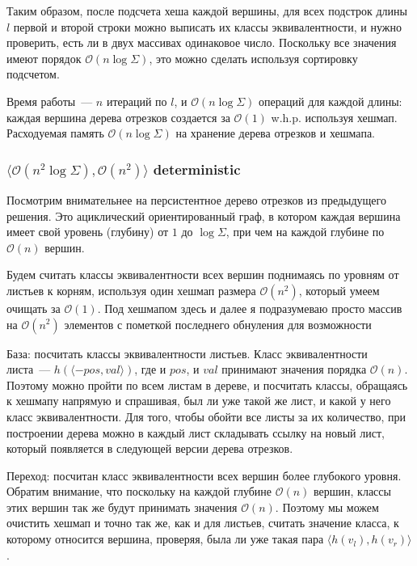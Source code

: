 Таким образом, после подсчета хеша каждой вершины, для всех подстрок длины $l$ первой и второй строки можно выписать их классы эквивалентности, и нужно проверить, есть ли в двух массивах одинаковое число. Поскольку все значения имеют порядок $\mathcal{O}(n \log \Sigma)$, это можно сделать используя сортировку подсчетом.

Время работы~--- $n$ итераций по $l$, и $\mathcal{O}(n \log \Sigma)$ операций для каждой длины: каждая вершина дерева отрезков создается за $\mathcal{O}(1)$ w.h.p. используя хешмап. Расходуемая память $\mathcal{O}(n \log \Sigma)$ на хранение дерева отрезков и хешмапа.


\subsubsection{$\langle \mathcal{O}(n^2 \log \Sigma), \mathcal{O}(n^2) \rangle$ deterministic}

Посмотрим внимательнее на персистентное дерево отрезков из предыдущего решения. Это ациклический ориентированный граф, в котором каждая вершина имеет свой уровень (глубину) от $1$ до $\log \Sigma$, при чем на каждой глубине по $\mathcal{O}(n)$ вершин.

Будем считать классы эквивалентности всех вершин поднимаясь по уровням от листьев к корням, используя один хешмап размера $\mathcal{O}(n^2)$, который умеем очищать за $\mathcal{O}(1)$. Под хешмапом здесь и далее я подразумеваю просто массив на $\mathcal{O}(n^2)$ элементов с пометкой последнего обнуления для возможности 

База: посчитать классы эквивалентности листьев. Класс эквивалентности листа~--- $h(\langle -pos, val \rangle)$, где и $pos$, и $val$ принимают значения порядка $\mathcal{O}(n)$. Поэтому можно пройти по всем листам в дереве, и посчитать классы, обращаясь к хешмапу напрямую и спрашивая, был ли уже такой же лист, и какой у него класс эквивалентности. Для того, чтобы обойти все листы за их количество, при построении дерева можно в каждый лист складывать ссылку на новый лист, который появляется в следующей версии дерева отрезков.

Переход: посчитан класс эквивалентности всех вершин более глубокого уровня. Обратим внимание, что поскольку на каждой глубине $\mathcal{O}(n)$ вершин, классы этих вершин так же будут принимать значения $\mathcal{O}(n)$. Поэтому мы можем очистить хешмап и точно так же, как и для листьев, считать значение класса, к которому относится вершина, проверяя, была ли уже такая пара $\langle h(v_l), h(v_r) \rangle$.

